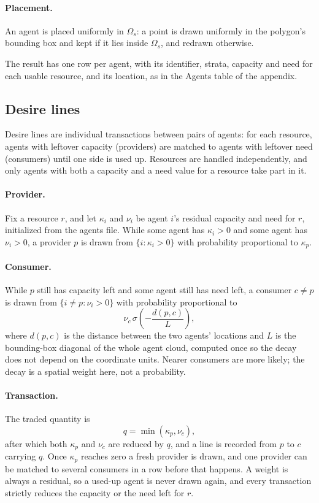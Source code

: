 \paragraph{Placement.}
An agent is placed uniformly in $\Omega_s$: a point is drawn uniformly in the polygon's
bounding box and kept if it lies inside $\Omega_s$, and redrawn otherwise.

The result has one row per agent, with its identifier, strata, capacity and need for each
usable resource, and its location, as in the Agents table of the appendix.

\subsection{Desire lines}

Desire lines are individual transactions between pairs of agents: for each resource,
agents with leftover capacity (providers) are matched to agents with leftover need
(consumers) until one side is used up. Resources are handled independently, and only
agents with both a capacity and a need value for a resource take part in it.

\paragraph{Provider.}
Fix a resource $r$, and let $\kappa_i$ and $\nu_i$ be agent $i$'s residual capacity and
need for $r$, initialized from the agents file. While some agent has $\kappa_i > 0$ and
some agent has $\nu_i > 0$, a provider $p$ is drawn from $\{i : \kappa_i > 0\}$ with
probability proportional to $\kappa_p$.

\paragraph{Consumer.}
While $p$ still has capacity left and some agent still has need left, a consumer
$c \neq p$ is drawn from $\{i \neq p : \nu_i > 0\}$ with probability proportional to
\begin{equation}
  \nu_c \, \sigma\!\left(-\frac{d(p,c)}{L}\right),
\end{equation}
where $d(p,c)$ is the distance between the two agents' locations and $L$ is the
bounding-box diagonal of the whole agent cloud, computed once so the decay does not
depend on the coordinate units. Nearer consumers are more likely; the decay is a spatial
weight here, not a probability.

\paragraph{Transaction.}
The traded quantity is
\begin{equation}
  q = \min(\kappa_p, \nu_c),
\end{equation}
after which both $\kappa_p$ and $\nu_c$ are reduced by $q$, and a line is recorded from
$p$ to $c$ carrying $q$. Once $\kappa_p$ reaches zero a fresh provider is drawn, and
one provider can be matched to several consumers in a row before that happens. A weight
is always a residual, so a used-up agent is never drawn again, and every transaction
strictly reduces the capacity or the need left for $r$.

